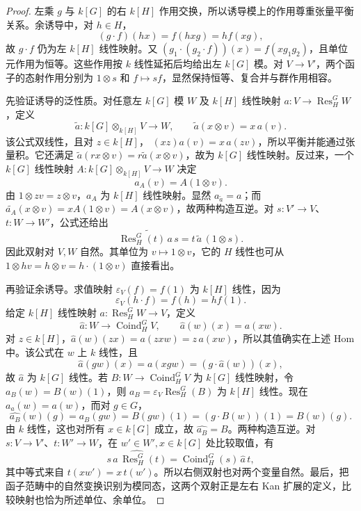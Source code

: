 \begin{proof}
	左乘 \(g\) 与 \(k[G]\) 的右 \(k[H]\) 作用交换，所以诱导模上的作用尊重张量平衡关系。余诱导中，对 \(h\in H\)，
	\[
		(g\cdot f)(hx)=f(hxg)=h f(xg),
	\]
	故 \(g\cdot f\) 仍为左 \(k[H]\) 线性映射。又
	\((g_1\cdot(g_2\cdot f))(x)=f(xg_1g_2)\)，且单位元作用为恒等。这些作用按 \(k\) 线性延拓后均给出左 \(k[G]\) 模。对 \(V\rightarrow V'\)，两个函子的态射作用分别为 \(1\otimes s\) 和 \(f\mapsto sf\)，显然保持恒等、复合并与群作用相容。

	先验证诱导的泛性质。对任意左 \(k[G]\) 模 \(W\) 及 \(k[H]\) 线性映射 \(a:V\rightarrow\operatorname{Res}^G_H W\)，定义
	\[
		\widetilde a:k[G]\otimes_{k[H]}V\longrightarrow W,
		\qquad \widetilde a(x\otimes v)=x\,a(v).
	\]
	该公式双线性，且对 \(z\in k[H]\)，
	\((xz)a(v)=x\,a(zv)\)，所以平衡并能通过张量积。它还满足 \(\widetilde a(rx\otimes v)=r\widetilde a(x\otimes v)\)，故为 \(k[G]\) 线性映射。反过来，一个 \(k[G]\) 线性映射 \(A:k[G]\otimes_{k[H]}V\rightarrow W\) 决定
	\[
		a_A(v)=A(1\otimes v).
	\]
	由 \(1\otimes zv=z\otimes v\)，\(a_A\) 为 \(k[H]\) 线性映射。显然 \(a_{\widetilde a}=a\)；而
	\(\widetilde{a_A}(x\otimes v)=xA(1\otimes v)=A(x\otimes v)\)，故两种构造互逆。对 \(s:V'\rightarrow V\)、\(t:W\rightarrow W'\)，公式还给出
	\[
		\widetilde{\operatorname{Res}^G_H(t)\,a\,s}
		=t\,\widetilde a\,(1\otimes s).
	\]
	因此双射对 \(V,W\) 自然。其单位为 \(v\mapsto1\otimes v\)，它的 \(H\) 线性也可从
	\(1\otimes hv=h\otimes v=h\cdot(1\otimes v)\) 直接看出。

	再验证余诱导。求值映射 \(\varepsilon_V(f)=f(1)\) 为 \(k[H]\) 线性，因为
	\[
		\varepsilon_V(h\cdot f)=f(h)=h f(1).
	\]
	给定 \(k[H]\) 线性映射 \(a:\operatorname{Res}^G_H W\rightarrow V\)，定义
	\[
		\widehat a:W\longrightarrow\operatorname{Coind}^G_H V,
		\qquad \widehat a(w)(x)=a(xw).
	\]
	对 \(z\in k[H]\)，\(\widehat a(w)(zx)=a(zxw)=z\,a(xw)\)，所以其值确实在上述 Hom 中。该公式在 \(w\) 上 \(k\) 线性，且
	\[
		\widehat a(gw)(x)=a(xgw)
		=(g\cdot\widehat a(w))(x),
	\]
	故 \(\widehat a\) 为 \(k[G]\) 线性。若 \(B:W\rightarrow\operatorname{Coind}^G_H V\) 为 \(k[G]\) 线性映射，令 \(a_B(w)=B(w)(1)\)，则 \(a_B=\varepsilon_V\operatorname{Res}^G_H(B)\) 为 \(k[H]\) 线性。现在 \(a_{\widehat a}(w)=a(w)\)，而对 \(g\in G\)，
	\[
		\widehat{a_B}(w)(g)
		=a_B(gw)=B(gw)(1)
		=(g\cdot B(w))(1)=B(w)(g).
	\]
	由 \(k\) 线性，这也对所有 \(x\in k[G]\) 成立，故 \(\widehat{a_B}=B\)。两种构造互逆。对 \(s:V\rightarrow V'\)、\(t:W'\rightarrow W\)，在 \(w'\in W',x\in k[G]\) 处比较取值，有
	\[
		\widehat{s\,a\,\operatorname{Res}^G_H(t)}
		=\operatorname{Coind}^G_H(s)\,\widehat a\,t,
	\]
	其中等式来自 \(t(xw')=x\,t(w')\)。所以右侧双射也对两个变量自然。最后，把函子范畴中的自然变换识别为模同态，这两个双射正是左右 Kan 扩展的定义，比较映射也恰为所述单位、余单位。
\end{proof}

